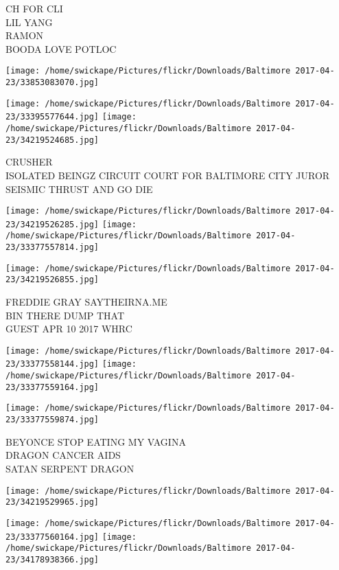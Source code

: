 \documentclass[10pt,letterpaper]{article}
\begin{document}
CH FOR CLI\\
LIL YANG\\
RAMON\\
BOODA LOVE POTLOC
\pagebreak

\texttt{[image: /home/swickape/Pictures/flickr/Downloads/Baltimore 2017-04-23/33853083070.jpg]}

\vspace{0.25in}
\texttt{[image: /home/swickape/Pictures/flickr/Downloads/Baltimore 2017-04-23/33395577644.jpg]}
\texttt{[image: /home/swickape/Pictures/flickr/Downloads/Baltimore 2017-04-23/34219524685.jpg]}

CRUSHER\\
ISOLATED BEINGZ CIRCUIT COURT FOR BALTIMORE CITY JUROR\\
SEISMIC THRUST AND GO DIE
\pagebreak

\texttt{[image: /home/swickape/Pictures/flickr/Downloads/Baltimore 2017-04-23/34219526285.jpg]}
\texttt{[image: /home/swickape/Pictures/flickr/Downloads/Baltimore 2017-04-23/33377557814.jpg]}

\vspace{0.25in}
\texttt{[image: /home/swickape/Pictures/flickr/Downloads/Baltimore 2017-04-23/34219526855.jpg]}

FREDDIE GRAY SAYTHEIRNA.ME\\
BIN THERE DUMP THAT\\
GUEST APR 10 2017 WHRC
\pagebreak

\texttt{[image: /home/swickape/Pictures/flickr/Downloads/Baltimore 2017-04-23/33377558144.jpg]}
\texttt{[image: /home/swickape/Pictures/flickr/Downloads/Baltimore 2017-04-23/33377559164.jpg]}

\texttt{[image: /home/swickape/Pictures/flickr/Downloads/Baltimore 2017-04-23/33377559874.jpg]}

BEYONCE STOP EATING MY VAGINA\\
DRAGON CANCER AIDS\\
SATAN SERPENT DRAGON
\pagebreak

\texttt{[image: /home/swickape/Pictures/flickr/Downloads/Baltimore 2017-04-23/34219529965.jpg]}

\vspace{0.25in}
\texttt{[image: /home/swickape/Pictures/flickr/Downloads/Baltimore 2017-04-23/33377560164.jpg]}
\texttt{[image: /home/swickape/Pictures/flickr/Downloads/Baltimore 2017-04-23/34178938366.jpg]}
\end{document}

